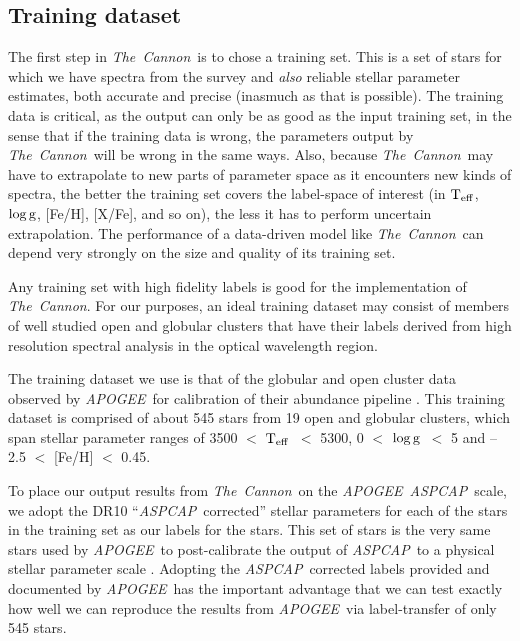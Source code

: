 \documentclass[12pt, preprint]{aastex}
\newcommand{\teff}{\mbox{$\rm T_{eff}$}}
\newcommand{\logg}{\mbox{$\rm \log g$}}
\newcommand{\tc}{\textsl{The~Cannon}}
\newcommand{\apogee}{\textsl{APOGEE}}
\newcommand{\aspcap}{\textsl{ASPCAP}}
\begin{document}
\subsection{Training dataset}

The first step in \tc\ is to chose a training set. This is a set of stars for which we have spectra from the survey and
\emph{also} reliable stellar parameter estimates, both accurate and
precise (inasmuch as that is possible).
The training data is critical, as the output can only be as good as
the input training set, in the sense that if the training data is
wrong, the parameters output by \tc\ will be wrong in the same ways.
Also, because \tc\ may have to extrapolate to new parts of parameter
space as it encounters new kinds of spectra, the better the training
set covers the label-space of interest (in \teff, \logg, [Fe/H],
[X/Fe], and so on), the less it has to perform uncertain
extrapolation.
The performance of a data-driven model like \tc\ can depend very
strongly on the size and quality of its training set.

Any training set with high fidelity labels is good for the implementation of \tc. For our purposes, an ideal training dataset may consist of members of
well studied open and globular clusters that have their labels derived from high resolution spectral analysis in the
optical wavelength region.


The training dataset we use is that of the globular and open cluster data observed by \apogee\ for calibration of their abundance pipeline \citep{Meszaros2013}. This training dataset is comprised of about 545 stars from 19 open and globular clusters, which span stellar parameter ranges of 3500 $<$ \teff\ $<$ 5300, 0 $<$ \logg\ $<$ 5 and --2.5 $<$ [Fe/H] $<$ 0.45. 


To place our output results from \tc\ on the \apogee\ \aspcap\ scale, we adopt the DR10 ``\aspcap\ corrected'' stellar parameters for each of the stars in the training set as our labels for the stars. This set of stars is the very same stars used by \apogee\ to  post-calibrate the output of \aspcap\ to a physical stellar parameter scale \citep{Meszaros2013}. Adopting the \aspcap\ corrected labels provided and documented by \apogee\  has the important advantage that we can test exactly how well we can reproduce the results from \apogee\ via label-transfer of only 545 stars.
\end{document}
